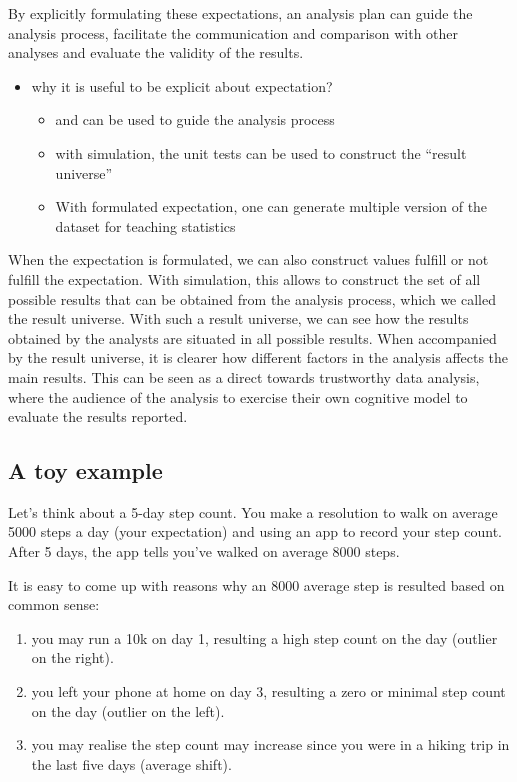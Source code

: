 \documentclass[
]{jds}
\providecommand{\tightlist}{%
  \setlength{\itemsep}{0pt}\setlength{\parskip}{0pt}}\usepackage{longtable,booktabs,array}
\begin{document}
By explicitly formulating these expectations, an analysis plan can guide
the analysis process, facilitate the communication and comparison with
other analyses and evaluate the validity of the results.

\begin{itemize}
\tightlist
\item
  why it is useful to be explicit about expectation?

  \begin{itemize}
  \tightlist
  \item
    and can be used to guide the analysis process
  \item
    with simulation, the unit tests can be used to construct the
    ``result universe''
  \item
    With formulated expectation, one can generate multiple version of
    the dataset for teaching statistics
  \end{itemize}
\end{itemize}

When the expectation is formulated, we can also construct values fulfill
or not fulfill the expectation. With simulation, this allows to
construct the set of all possible results that can be obtained from the
analysis process, which we called the result universe. With such a
result universe, we can see how the results obtained by the analysts are
situated in all possible results. When accompanied by the result
universe, it is clearer how different factors in the analysis affects
the main results. This can be seen as a direct towards trustworthy data
analysis, where the audience of the analysis to exercise their own
cognitive model \citep{grolemund_cognitive_2014} to evaluate the results
reported.

\subsection{A toy example}\label{a-toy-example}

Let's think about a 5-day step count. You make a resolution to walk on
average 5000 steps a day (your expectation) and using an app to record
your step count. After 5 days, the app tells you've walked on average
8000 steps.

It is easy to come up with reasons why an 8000 average step is resulted
based on common sense:

\begin{enumerate}
\def\labelenumi{\arabic{enumi}.}
\tightlist
\item
  you may run a 10k on day 1, resulting a high step count on the day
  (outlier on the right).
\item
  you left your phone at home on day 3, resulting a zero or minimal step
  count on the day (outlier on the left).
\item
  you may realise the step count may increase since you were in a hiking
  trip in the last five days (average shift).
\end{enumerate}
\end{document}
